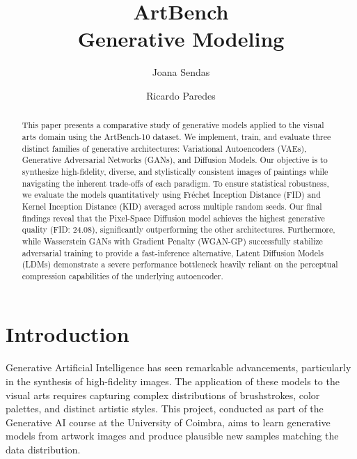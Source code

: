 \documentclass[runningheads]{llncs}
\begin{document}
%
\title{ArtBench\\Generative Modeling}
%
%
\author{Joana Sendas \and Ricardo Paredes}
%
%
%
\maketitle              %
%
\begin{abstract}
This paper presents a comparative study of generative models applied to the visual arts domain using the ArtBench-10 dataset. We implement, train, and evaluate three distinct families of generative architectures: Variational Autoencoders (VAEs), Generative Adversarial Networks (GANs), and Diffusion Models. Our objective is to synthesize high-fidelity, diverse, and stylistically consistent images of paintings while navigating the inherent trade-offs of each paradigm. To ensure statistical robustness, we evaluate the models quantitatively using Fréchet Inception Distance (FID) and Kernel Inception Distance (KID) averaged across multiple random seeds. Our final findings reveal that the Pixel-Space Diffusion model achieves the highest generative quality (FID: 24.08), significantly outperforming the other architectures. Furthermore, while Wasserstein GANs with Gradient Penalty (WGAN-GP) successfully stabilize adversarial training to provide a fast-inference alternative, Latent Diffusion Models (LDMs) demonstrate a severe performance bottleneck heavily reliant on the perceptual compression capabilities of the underlying autoencoder.

\end{abstract}
%
%
%
\section{Introduction}
Generative Artificial Intelligence has seen remarkable advancements, particularly in the synthesis of high-fidelity images. The application of these models to the visual arts requires capturing complex distributions of brushstrokes, color palettes, and distinct artistic styles. This project, conducted as part of the Generative AI course at the University of Coimbra, aims to learn generative models from artwork images and produce plausible new samples matching the data distribution. 
\end{document}
